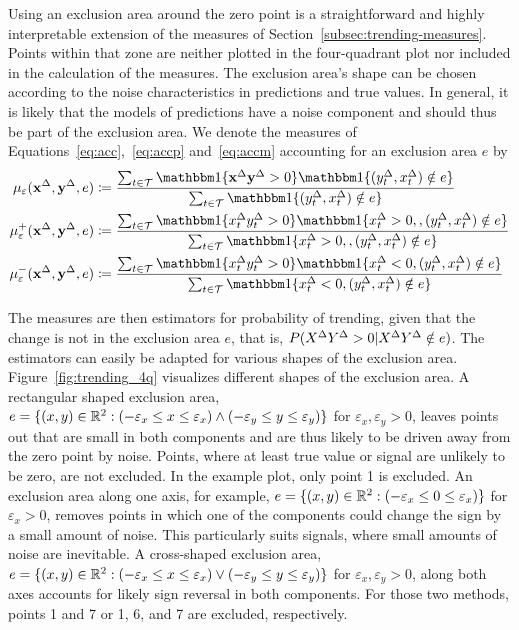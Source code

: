 Using an exclusion area around the zero point is a straightforward and highly interpretable extension of the measures of Section~\ref{subsec:trending-measures}.
Points within that zone are neither plotted in the four-quadrant plot nor included in the calculation of the measures.
The exclusion area's shape can be chosen according to the noise characteristics in predictions and true values.
In general, it is likely that the models of predictions have a noise component and should thus be part of the exclusion area.
We denote the measures of Equations~\eqref{eq:acc},~\eqref{eq:accp} and~\eqref{eq:accm} accounting for an exclusion area $e$ by
\begin{align}
    \acceps (\diffx, \diffy, e) &\coloneqq \frac{\sum_{t \in \mathcal{T}} \ind{\diffx \diffy > 0} \ind{(\diffyt, \diffxt) \notin e}}{\sum_{t \in \mathcal{T}} \ind{(\diffyt, \diffxt) \notin e}}\label{eq:acceps}\\
    \accpeps (\diffx, \diffy, e) &\coloneqq \frac{\sum_{t \in \mathcal{T}} \ind{\diffxt \diffyt > 0} \ind{\diffxt > 0, , (\diffyt, \diffxt) \notin e}}{\sum_{t \in \mathcal{T}} \ind{\diffxt > 0, , (\diffyt, \diffxt) \notin e}} \label{eq:accpeps}\\
    \accmeps (\diffx, \diffy, e) &\coloneqq \frac{\sum_{t \in \mathcal{T}} \ind{\diffxt \diffyt > 0} \ind{\diffxt < 0, (\diffyt, \diffxt) \notin e}}{\sum_{t \in \mathcal{T}} \ind{\diffxt < 0, (\diffyt, \diffxt) \notin e}}\label{eq:accmeps}
\end{align}


The measures are then estimators for probability of trending, given that the change is not in the exclusion area $e$, that is, $P(X^{\Delta} Y^{\Delta} > 0 | X^{\Delta} Y^{\Delta} \notin e)$.
The estimators can easily be adapted for various shapes of the exclusion area.
Figure~\ref{fig:trending_4q} visualizes different shapes of the exclusion area.
A rectangular shaped exclusion area, $e = \{(x, y) \in \mathbb{R}^2: (-\varepsilon_x \leq x \leq \varepsilon_x) \land (-\varepsilon_y \leq y \leq \varepsilon_y) \}$ for $\varepsilon_x, \varepsilon_y > 0$, leaves points out that are small in both components and are thus likely to be driven away from the zero point by noise.
Points, where at least true value or signal are unlikely to be zero, are not excluded.
In the example plot, only point 1 is excluded.
An exclusion area along one axis, for example, $e = \{(x, y) \in \mathbb{R}^2: (-\varepsilon_x \leq 0 \leq \varepsilon_x)\}$ for $\varepsilon_x > 0$, removes points in which one of the components could change the sign by a small amount of noise.
This particularly suits signals, where small amounts of noise are inevitable.
A cross-shaped exclusion area, $e = \{(x, y) \in \mathbb{R}^2: (-\varepsilon_x \leq x \leq \varepsilon_x) \lor (-\varepsilon_y \leq y \leq \varepsilon_y) \}$ for $\varepsilon_x, \varepsilon_y > 0$, along both axes accounts for likely sign reversal in both components.
For those two methods, points 1 and 7 or 1, 6, and 7 are excluded, respectively.

